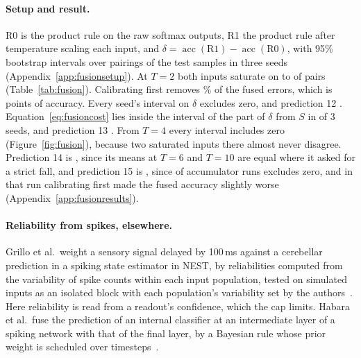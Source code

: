 \paragraph{Setup and result.}
R0 is the product rule on the raw softmax outputs, R1 the product rule after temperature scaling
each input, and $\delta=\operatorname{acc}(\mathrm{R1})-\operatorname{acc}(\mathrm{R0})$, with 95\%
bootstrap intervals over \fuPairings{} pairings of the \nmSplitTest{} test samples in three seeds %
(Appendix~\ref{app:fusionsetup}). At $T=2$ both inputs saturate on \fuTwoPSMin{} to %
\fuTwoPSMax{} of pairs (Table~\ref{tab:fusion}). Calibrating first removes \fuTwoErrCut\% of the %
fused errors, which is \fuTwoDeltaPoints{} points of accuracy. Every seed's interval on $\delta$ %
excludes zero, and prediction 12 \verdictTwelve. Equation~\eqref{eq:fusioncost} lies inside the %
interval of the part of $\delta$ from $S$ in \fuThirteenWithin{} of 3 seeds, and prediction 13 %
\verdictThirteen. From $T=4$ every interval includes zero (Figure~\ref{fig:fusion}), because two
saturated inputs there almost never disagree. Prediction 14 is \verdictFourteen, since its means at %
$T=6$ and $T=10$ are equal where it asked for a strict fall, and prediction 15 is \verdictFifteen,
since \fuAccumExcl{} of \fuAccumRuns{} accumulator runs excludes zero, and in that run calibrating first made the fused accuracy slightly worse %
(Appendix~\ref{app:fusionresults}).

\paragraph{Reliability from spikes, elsewhere.}
Grillo et al.\ weight a sensory signal delayed by 100\,ms against a cerebellar prediction in a
spiking state estimator in NEST, by reliabilities computed from the variability of spike counts
within each input population, tested on simulated inputs as an isolated block with each
population's variability set by the authors~\citep{grillo2022bayesian}. Here reliability is read %
from a readout's confidence, which the cap limits. Habara et al.\ fuse the prediction of an
internal classifier at an intermediate layer of a spiking network with that of the final layer,
by a Bayesian rule whose prior weight is scheduled over timesteps~\citep{habara2024bayesianspikefusion}. %


